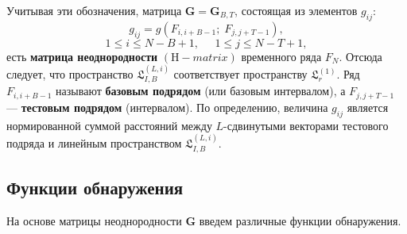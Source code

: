 \documentclass[specialist, substylefile = spbu.rtx,
			   subf, href, 12pt]{disser}
\begin{document}
Учитывая эти обозначения, матрица $ \mathbf{G} = \mathbf{G}_{B, T} $, состоящая из элементов $g_{ij}$:
\begin{equation} \label{eq:g_elements}
	g_{ij} = g(F_{i, i+B-1};\;F_{j, j+T-1}),
\end{equation}
$$1 \leq i \leq N-B+1,\;\;\;\;\; 1 \leq j \leq N-T+1,$$
есть \textbf{матрица неоднородности} $ (\mathrm{H}-matrix) $ временного ряда $ F_N $. Отсюда следует, что пространство $ \mathfrak{L}_{I, B}^{(L, i)} $ соответствует пространству $ \mathfrak{L}_r^{(1)} $. Ряд $ F_{i, i+B-1} $ называют \textbf{базовым подрядом} (или базовым интервалом), а $ F_{j, j+T-1} $ --- \textbf{тестовым подрядом} (интервалом). По определению, величина $g_{ij}$ является нормированной суммой расстояний между $L$-сдвинутыми векторами тестового подряда и линейным пространством $ \mathfrak{L}_{I, B}^{(L, i)} $. 

\subsection{Функции обнаружения}
На основе матрицы неоднородности $ \mathbf{G} $ введем различные функции обнаружения.
\end{document}
